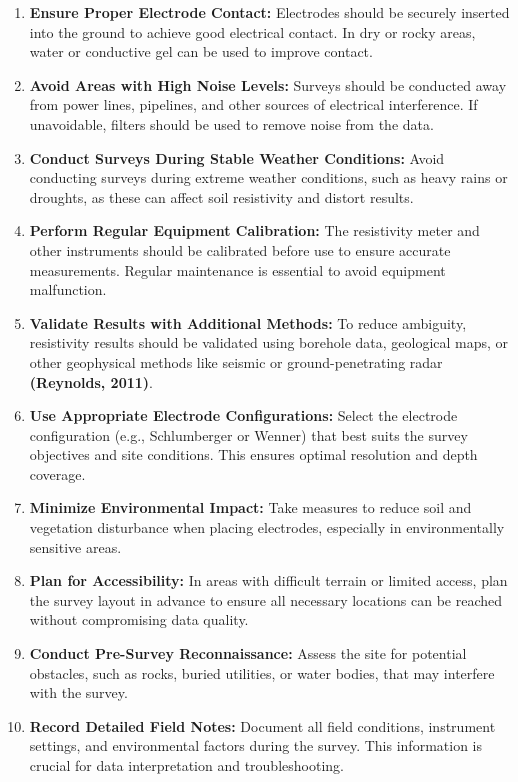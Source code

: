 \documentclass[12pt,a4paper]{report}
\begin{document}
\begin{enumerate}
    \item \textbf{Ensure Proper Electrode Contact:} Electrodes should be securely inserted into the ground to achieve good electrical contact. In dry or rocky areas, water or conductive gel can be used to improve contact.
    \item \textbf{Avoid Areas with High Noise Levels:} Surveys should be conducted away from power lines, pipelines, and other sources of electrical interference. If unavoidable, filters should be used to remove noise from the data.
    \item \textbf{Conduct Surveys During Stable Weather Conditions:} Avoid conducting surveys during extreme weather conditions, such as heavy rains or droughts, as these can affect soil resistivity and distort results.
    \item \textbf{Perform Regular Equipment Calibration:} The resistivity meter and other instruments should be calibrated before use to ensure accurate measurements. Regular maintenance is essential to avoid equipment malfunction.
    \item \textbf{Validate Results with Additional Methods:} To reduce ambiguity, resistivity results should be validated using borehole data, geological maps, or other geophysical methods like seismic or ground-penetrating radar \textbf{(Reynolds, 2011)}.
    \item \textbf{Use Appropriate Electrode Configurations:} Select the electrode configuration (e.g., Schlumberger or Wenner) that best suits the survey objectives and site conditions. This ensures optimal resolution and depth coverage.
    \item \textbf{Minimize Environmental Impact:} Take measures to reduce soil and vegetation disturbance when placing electrodes, especially in environmentally sensitive areas.
    \item \textbf{Plan for Accessibility:} In areas with difficult terrain or limited access, plan the survey layout in advance to ensure all necessary locations can be reached without compromising data quality.
    \item \textbf{Conduct Pre-Survey Reconnaissance:} Assess the site for potential obstacles, such as rocks, buried utilities, or water bodies, that may interfere with the survey.
    \item \textbf{Record Detailed Field Notes:} Document all field conditions, instrument settings, and environmental factors during the survey. This information is crucial for data interpretation and troubleshooting.
\end{enumerate}
\end{document}
